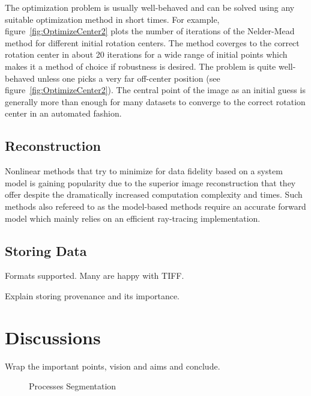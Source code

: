 \documentclass[pdf]{iucr}              %
\begin{document}
The optimization problem is usually well-behaved and can be solved using any suitable optimization method in short times. For example, figure~\ref{fig:OptimizeCenter2} plots the number of iterations of the Nelder-Mead method for different initial rotation centers. The method coverges to the correct rotation center in about 20 iterations for a wide range of initial points which makes it a method of choice if robustness is desired. The problem is quite well-behaved unless one picks a very far off-center position (see figure~\ref{fig:OptimizeCenter2}). The central point of the image as an initial guess is generally more than enough for many datasets to converge to the correct rotation center in an automated fashion.

\subsection{Reconstruction}
Nonlinear methods that try to minimize for data fidelity based on a system model is gaining popularity due to the superior image reconstruction that they offer despite the dramatically increased computation complexity and times. Such methods also refereed to as the model-based methods require an accurate forward model which mainly relies on an efficient ray-tracing implementation. 


\subsection{Storing Data}

Formats supported. Many are happy with TIFF. 

Explain storing provenance and its importance.

\section{Discussions}

Wrap the important points, vision and aims and conclude.


\onecolumn
\begin{figure}
\centering
\caption{Processes Segmentation}
\label{fig:ProcessSegmentation}
\end{figure}
\twocolumn
\end{document}
